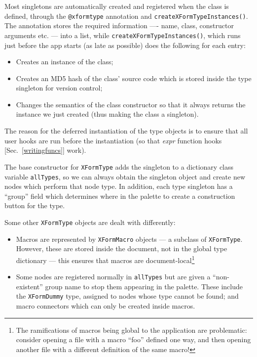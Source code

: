 Most singletons are automatically created and registered when the class
is defined, through the \texttt{@xformtype} annotation and \texttt{createXFormTypeInstances()}. 
The annotation stores the required information ---- name, class, constructor arguments etc. ---
into a list, while \texttt{createXFormTypeInstances()}, which runs just before the app starts (as
late as possible) does the following for each entry:
\begin{itemize}
\item Creates an instance of the class;
\item Creates an MD5 hash of the class' source code which is stored
inside the type singleton for version control;
\item Changes the semantics of the class constructor so that
it always returns the instance we just created (thus making the class
a singleton).
\end{itemize}
The reason for the deferred instantiation of the type objects is to ensure that all user
hooks are run before the instantiation (so that \emph{expr} function hooks [Sec.~\ref{writingfuncs}]
work).

The base constructor for \texttt{XFormType} adds the singleton
to a dictionary class variable \texttt{allTypes}, so we can always
obtain the singleton object and create new nodes which perform that
node type. In addition, each type singleton has a ``group'' field which 
determines where in the palette to create a construction button for the type.

Some other \texttt{XFormType} objects are dealt with differently:
\begin{itemize}
\item Macros are represented by \texttt{XFormMacro} objects --- a subclass
of \texttt{XFormType}. However, these
are stored inside the document, not in the global type
dictionary --- this ensures that macros are document-local\footnote{The
ramifications of macros being global to the application are problematic:
consider opening a file with a macro ``foo'' defined one way, and then
opening another file with a different definition of the same macro!}
\item Some nodes are registered normally in \texttt{allTypes} but are given
a ``non-existent'' group name to stop them appearing in the palette.
These include the \texttt{XFormDummy} type, assigned to nodes whose
type cannot be found; and macro connectors which can only be created inside
macros.
\end{itemize}

